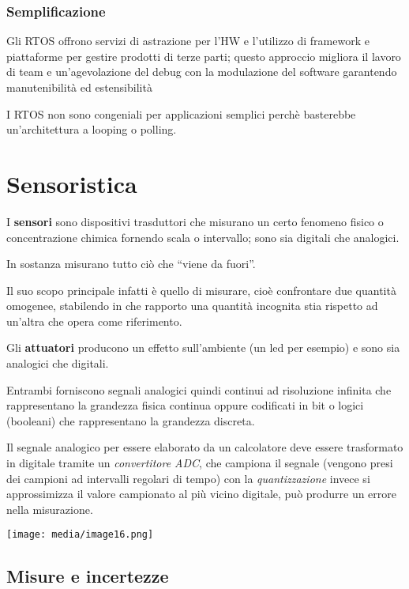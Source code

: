 \subsubsection{Semplificazione}\label{semplificazione}

Gli RTOS offrono servizi di astrazione per l'HW e l'utilizzo di
framework e piattaforme per gestire prodotti di terze parti; questo
approccio migliora il lavoro di team e un'agevolazione del debug con la
modulazione del software garantendo manutenibilità ed estensibilità

I RTOS non sono congeniali per applicazioni semplici perchè basterebbe
un'architettura a looping o polling.

\section{Sensoristica}\label{sensoristica}

I \textbf{sensori} sono dispositivi trasduttori che misurano un certo
fenomeno fisico o concentrazione chimica fornendo scala o intervallo;
sono sia digitali che analogici.

In sostanza misurano tutto ciò che ``viene da fuori''.

Il suo scopo principale infatti è quello di misurare, cioè confrontare
due quantità omogenee, stabilendo in che rapporto una quantità incognita
stia rispetto ad un'altra che opera come riferimento.

Gli \textbf{attuatori} producono un effetto sull'ambiente (un led per
esempio) e sono sia analogici che digitali.

Entrambi forniscono segnali analogici quindi continui ad risoluzione
infinita che rappresentano la grandezza fisica continua oppure
codificati in bit o logici (booleani) che rappresentano la grandezza
discreta.

Il segnale analogico per essere elaborato da un calcolatore deve essere
trasformato in digitale tramite un \emph{convertitore ADC}, che campiona
il segnale (vengono presi dei campioni ad intervalli regolari di tempo)
con la \emph{quantizzazione} invece si approssimizza il valore
campionato al più vicino digitale, può produrre un errore nella
misurazione.

\texttt{[image: media/image16.png]}

\subsection{Misure e incertezze}\label{misure-e-incertezze}

